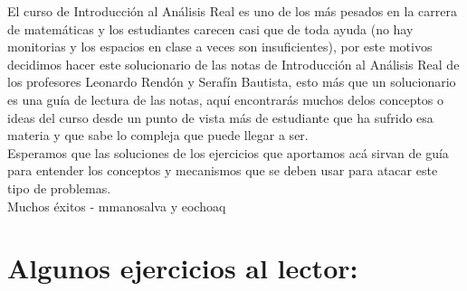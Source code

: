 
El curso de Introducción al Análisis Real es uno de los más pesados en la carrera de matemáticas y los estudiantes carecen casi que de toda ayuda (no hay monitorias y los espacios en clase a veces son insuficientes), por este motivos decidimos hacer este solucionario de las notas de Introducción al Análisis Real de los profesores Leonardo Rendón y Serafín Bautista, esto más que un solucionario es una guía de lectura de las notas, aquí encontrarás muchos delos conceptos o ideas del curso desde un punto de vista más de estudiante que ha sufrido esa materia y que sabe lo compleja que puede llegar a ser.\\

Esperamos que las soluciones de los ejercicios que aportamos acá sirvan de guía para entender los conceptos y mecanismos que se deben usar para atacar este tipo de problemas.\\

Muchos éxitos - mmanosalva y eochoaq

\section{Algunos ejercicios al lector: }

